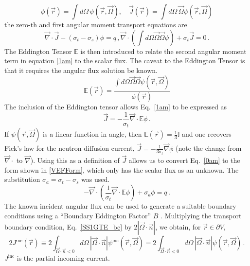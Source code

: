 \documentclass{article}
\newcommand{\vr}{\vec{r}}
\newcommand{\vO}{\vec{\Omega}}
\renewcommand{\div}{\vec{\nabla} \cdot}
\newcommand{\grad}{\vec{\nabla}}
\newcommand{\bound}{\partial V}
\newcommand{\vn}{\vec{n}}
\newcommand{\Edd}{\mathbb{E}}
\newcommand{\BEdd}{B}
\newcommand{\sigt}{\sigma_t}
\newcommand{\sigs}{\sigma_s}
\newcommand{\siga}{\sigma_a}
\newcommand{\scalSource}{q}
\begin{document}
\begin{equation}
\label{VETFormStart}
\phi(\vr)=\int d\Omega \, \psi( \vr,\vO )
,\quad
\vec{J}(\vr)= \int d\Omega \, \vO \psi( \vr,\vO )
\end{equation}
the zero-th and first angular moment transport equations are
%
\begin{subequations}
%
\begin{equation}
\label{0am}
\div \vec{J} + (\sigt-\sigs) \phi = \scalSource \,,
\end{equation}
%
\begin{equation}
\label{1am}
\div \left(  \int d\Omega \vO \vO \psi \right) + \sigt \vec{J} = 0 \,.
\end{equation}
%
\end{subequations}
The Eddington Tensor $\Edd$ is then introduced to relate the second angular moment term in equation \eqref{1am} to the scalar flux. The caveat to the Eddington Tensor is that it requires the angular flux solution be known.
\begin{equation}
\label{EddDef}
\Edd(\vr)=\frac{\int d\Omega \vO \vO \psi(\vr,\vO)}{\phi(\vr)}
\end{equation}
The inclusion of the Eddington tensor allows Eq.~\eqref{1am} to be expressed as 
\[
\vec{J} = - \frac{1}{\sigt} \div \Edd \phi \,.
\]
If $\psi(\vr,\vO)$ is a linear function in angle, then $\Edd(\vr)=\tfrac{1}{3}\mathbb{I}$ and one recovers Fick's law for the neutron diffusion current, $\vec{J} = - \frac{1}{3\sigt} \grad \phi$ (note the change from $\div$ to $\grad$). Using this as a definition of $\vec{J}$ allows us to convert Eq.~\eqref{0am} to the form shown in \eqref{VEFForm}, which only has the scalar flux as an unknown. The substitution $\siga = \sigt-\sigs$ was used.
\begin{equation}
\label{VEFForm}
- \div \left( \frac{1}{\sigt}\div \Edd \phi \right) + \siga \phi = \scalSource \,.
\end{equation}
The known incident angular flux can be used to generate a suitable boundary conditions using a 
``Boundary Eddington Factor'' $\BEdd$ \cite{Miften}. Multiplying the transport boundary condition,
Eq.~\eqref{SS1GTE_bc} by $2 | \vO \cdot \vn |$, we obtain, for $\vr \in \bound$,
\begin{equation}
2 J^{\text{inc}}(\vr) \equiv  2 \int_{\vO \cdot \vn <0 }  d \Omega\, | \vO \cdot \vec{n} | \psi^{\text{inc}}(\vr,\vO) 
= 2\int_{\vO \cdot \vn <0 } d \Omega\,  | \vO \cdot \vn |  \psi(\vr,\vO) \,.
\end{equation}
$J^{\text{inc}}$ is the partial incoming current. 
\end{document}
